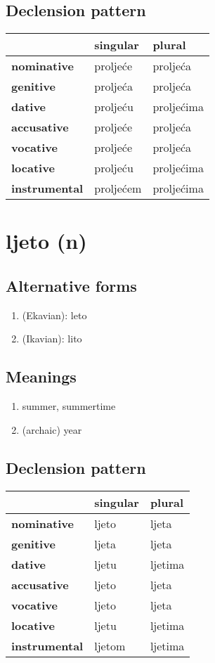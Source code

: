 \subsection*{Declension pattern}
\begin{tabularx}{\linewidth}{Xll}
\toprule
{} &   singular &      plural \\
\midrule
\textbf{nominative  } &   proljeće &    proljeća \\
\textbf{genitive    } &   proljeća &    proljeća \\
\textbf{dative      } &   proljeću &  proljećima \\
\textbf{accusative  } &   proljeće &    proljeća \\
\textbf{vocative    } &   proljeće &    proljeća \\
\textbf{locative    } &   proljeću &  proljećima \\
\textbf{instrumental} &  proljećem &  proljećima \\
\bottomrule
\end{tabularx}

\filbreak
\section{ljeto (n)}
\subsection*{Alternative forms}
\begin{enumerate}
\item (Ekavian): leto
\item (Ikavian): lito
\end{enumerate}
\subsection*{Meanings}
\begin{enumerate}
\item summer, summertime
\item (archaic) year
\end{enumerate}
\subsection*{Declension pattern}
\begin{tabularx}{\linewidth}{Xll}
\toprule
{} & singular &   plural \\
\midrule
\textbf{nominative  } &    ljeto &    ljeta \\
\textbf{genitive    } &    ljeta &    ljeta \\
\textbf{dative      } &    ljetu &  ljetima \\
\textbf{accusative  } &    ljeto &    ljeta \\
\textbf{vocative    } &    ljeto &    ljeta \\
\textbf{locative    } &    ljetu &  ljetima \\
\textbf{instrumental} &   ljetom &  ljetima \\
\bottomrule
\end{tabularx}

